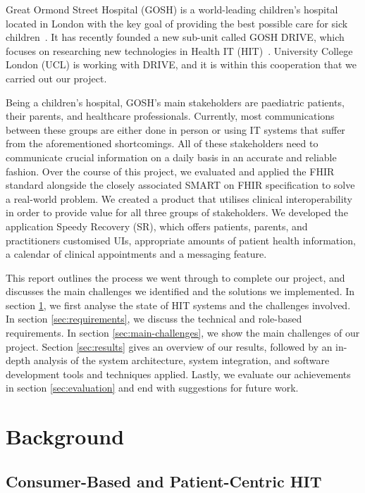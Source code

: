 \documentclass[sigconf]{acmart}
\begin{document}
Great Ormond Street Hospital (GOSH) is a world-leading children's hospital located in London with the key goal of providing the best possible care for sick children~\cite{gosh-our-vision}. It has recently founded a new sub-unit called GOSH DRIVE, which focuses on researching new technologies in Health IT (HIT)~\cite{gosh-opening-drive}. University College London (UCL) is working with DRIVE, and it is within this cooperation that we carried out our project.

Being a children's hospital, GOSH's main stakeholders are paediatric patients, their parents, and healthcare professionals. Currently, most communications between these groups are either done in person or using IT systems that suffer from the aforementioned shortcomings. All of these stakeholders need to communicate crucial information on a daily basis in an accurate and reliable fashion. Over the course of this project, we evaluated and applied the FHIR standard alongside the closely associated SMART on FHIR specification to solve a real-world problem. We created a product that utilises clinical interoperability in order to provide value for all three groups of stakeholders. We developed the application Speedy Recovery (SR), which offers patients, parents, and practitioners customised UIs, appropriate amounts of patient health information, a calendar of clinical appointments and a messaging feature.

This report outlines the process we went through to complete our project, and discusses the main challenges we identified and the solutions we implemented. In section \ref{sec:background}, we first analyse the state of HIT systems and the challenges involved. In section \ref{sec:requirements}, we discuss the technical and role-based requirements. In section \ref{sec:main-challenges}, we show the main challenges of our project. Section \ref{sec:results} gives an overview of our results, followed by an in-depth analysis of the system architecture, system integration, and software development tools and techniques applied. Lastly, we evaluate our achievements in section \ref{sec:evaluation} and end with suggestions for future work.


\section{Background}
\label{sec:background}


\subsection{Consumer-Based and Patient-Centric HIT}
\end{document}
